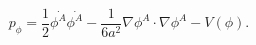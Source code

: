 \begin{equation}
p_\phi =\frac{1}{2}\stackrel{.}{\phi ^A}\stackrel{.}{\phi
^A}-\frac{1}{6a^2} \nabla \phi ^A\cdot \nabla \phi ^A-V(\phi ).
\label{pre0}
\end{equation}

